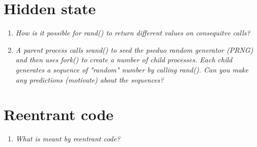 \documentclass[a4paper]{article}
\begin{document}
\section{Hidden state}
\begin{enumerate}
  \item \textit{ How is it possible for rand() to return different values on consequitve calls?}
  \item \textit{A parent process calls srand() to seed the pseduo random generator (PRNG) and then uses fork() to create a number of child processes. Each child generates a sequence of "random" number by calling rand(). Can you make any predictions (motivate) about the sequences?}
  
\end{enumerate}

\section{Reentrant code}
\begin{enumerate}
\item \textit{What is meant by reentrant code?}
\end{enumerate}
\end{document}

